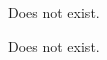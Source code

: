 \documentclass[12pt]{WisconsinThesis}
\begin{document}

    {\HELLO}
    {Does not exist.}


    {\HELLO}
    {Does not exist.}



%
%
%
%
%
\end{document}
